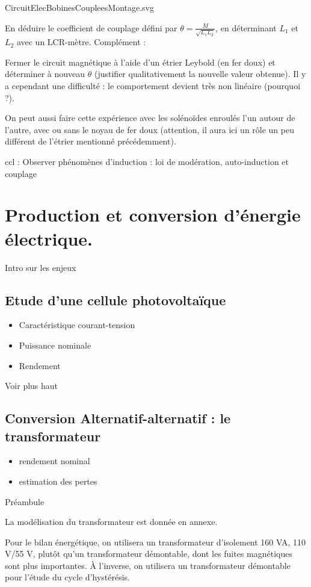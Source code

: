 \documentclass{article}%
\begin{document}
CircuitElecBobinesCoupleesMontage.svg

En déduire le coefficient de couplage défini par $\theta = \frac{M}{\sqrt {L_1 L_2 } }$, en déterminant $L_{1}$ et $L_{2}$ avec un LCR-mètre.
Complément :

Fermer le circuit magnétique à l'aide d'un étrier Leybold (en fer doux) et déterminer à nouveau $\theta$ (justifier qualitativement la nouvelle valeur obtenue). Il y a cependant une difficulté : le comportement devient très non linéaire (pourquoi ?).

On peut aussi faire cette expérience avec les solénoïdes enroulés l'un autour de l'autre, avec ou sans le noyau de fer doux (attention, il aura ici un rôle un peu différent de l'étrier mentionné précédemment). 

ccl : Observer phénomènes d'induction : loi de modération, auto-induction et couplage

\section{Production et conversion d'énergie électrique.}
Intro sur les enjeux
\subsection{Etude d'une cellule photovoltaïque}
\begin{itemize}
\item Caractéristique courant-tension
\item Puissance nominale
\item Rendement
\end{itemize}

Voir plus haut
\subsection{Conversion Alternatif-alternatif : le transformateur}
\begin{itemize}
\item rendement nominal
\item estimation des pertes
\end{itemize}
Préambule

La modélisation du transformateur est donnée en annexe.

Pour le bilan énergétique, on utilisera un transformateur d'isolement 160 VA, 110 V/55 V, plutôt qu'un transformateur démontable, dont les fuites magnétiques sont plus importantes. À l'inverse, on utilisera un transformateur démontable pour l'étude du cycle d'hystérésis.
\end{document}
